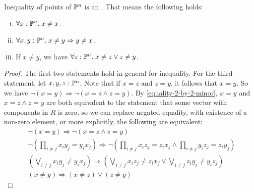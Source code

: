 \begin{lemma}%
  \label{projective-space-apartness-relation}
  Inequality of points of $\mathbb{P}^n$ is an .
  That means the following holds:
  \begin{enumerate}[(i)]
  \item $\forall x:\mathbb{P}^n.\; x\neq x$.
  \item $\forall x,y:\mathbb{P}^n.\; x\neq y\Rightarrow y\neq x$.
  \item If $x\neq y$, we have $\forall z:\mathbb{P}^n.\; x\neq z \vee z\neq y$.
  \end{enumerate}
\end{lemma}

\begin{proof}
  The first two statements hold in general for inequality.
  For the third statement, let $x,y,z:\mathbb{P}^n$.
  Note that if $x=z$ and $z=y$, it follows that $x=y$.
  So we have $\neg (x=y)\Rightarrow \neg (x=z\wedge z=y)$.
  By \cref{equality-2-by-2-minor}, $x=y$ and $x=z\wedge z=y$
  are both equivalent to the statement that some vector with components in $R$ is zero,
  so we can replace negated equality, with existence of a non-zero element,
  or more explicitly, the following are equivalent:
  \begin{align*}
    &\neg (x=y)\Rightarrow \neg (x=z\wedge z=y) \\
    &\neg \left(\prod_{i\neq j}x_iy_j=y_ix_j\right)
       \Rightarrow \neg \left(\prod_{i\neq j}x_iz_j=z_ix_j \wedge \prod_{i\neq j}y_iz_j=z_iy_j \right) \\
    & \left(\bigvee_{i\neq j}x_iy_j\neq y_ix_j\right) \Rightarrow \left(\bigvee_{i\neq j}x_iz_j\neq z_ix_j
       \vee \bigvee_{i\neq j}z_iy_j\neq y_iz_j\right) \\
    & (x\neq y) \Rightarrow (x\neq z) \vee (z\neq y)
  \end{align*}
\end{proof}

